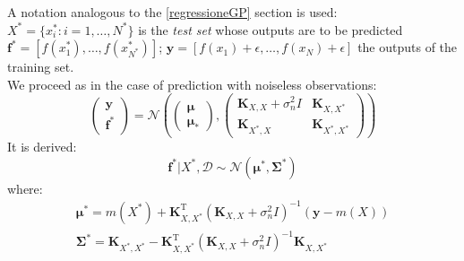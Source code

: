 \newpage

A notation analogous to the \ref{regressioneGP} section is used: $X^*=\{x_i^*: i=1,\dots,N^*\}$ is the \textit{test set} whose outputs are to be predicted $\bm{f^*}=\left[f(x^*_1), \dots, f(x^*_{N^*}) \right]$; $\bm{y}=\left[f(x_1)+\epsilon, \dots, f(x_N)+\epsilon \right]$ the outputs of the training set. \\
We proceed as in the case of prediction with noiseless observations:
\[
\begin{pmatrix}
\bm{y}\\
\bm{f^*}
\end{pmatrix}
=
\mathcal{N}\left(
\begin{pmatrix}
\bm{\mu}\\
\bm{\mu_*}
\end{pmatrix},
\begin{pmatrix}
\bm{K}_{X,X}+\sigma_n^2I & \bm{K}_{X,X^*}\\
\bm{K}_{X^*,X} & \bm{K}_{X^*,X^*}
\end{pmatrix}
\right)
\]
It is derived:
\[
\bm{f^*} | X^*, \mathcal{D} \sim \mathcal{N}(\bm{\mu^*}, \bm{\Sigma^*})
\]
where:
\[
\begin{split}
\bm{\mu^*}=m(X^*)+\bm{K}_{X,X^*}^\text{T}(\bm{K}_{X,X}+\sigma_n^2I)^{-1}(\bm{y}-m(X))\\
\bm{\Sigma^*}=\bm{K}_{X^*,X^*}-\bm{K}_{X,X^*}^\text{T}(\bm{K}_{X,X}+\sigma_n^2I)^{-1}\bm{K}_{X,X^*}
\end{split}
\]



